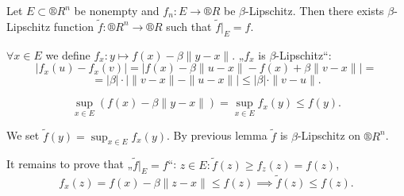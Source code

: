 \documentclass[12pt]{article}					%
\begin{document}
\begin{lemma}
	Let $E \subset ®R^n$ be nonempty and $f_n: E \rightarrow ®R$ be $\beta$-Lipschitz. Then there exists $\beta$-Lipschitz function $\tilde f: ®R^n \rightarrow ®R$ such that $\tilde f|_E = f$.

	\begin{dukazin}
		$\forall x \in E$ we define $f_x: y \mapsto f(x) - \beta \|y - x\|$. „$f_x$ is $\beta$-Lipschitz“:
		$$ |f_x(u) - f_x(v)| = \left|f(x) - \beta\|u - x\| - f(x) + \beta\|v - x\|\right| = $$
		$$ = |\beta|·\left| \|v - x\| - \|u - x\| \right| ≤ |\beta|·\|v - u\|. $$

		$$ \sup_{x \in E}(f(x) - \beta \|y - x\|) = \sup_{x \in E} f_x(y) ≤ f(y). $$

		We set $\tilde f(y) = \sup_{x \in E} f_x(y)$. By previous lemma $\tilde f$ is $\beta$-Lipschitz on $®R^n$.

		It remains to prove that „$\tilde f|_E = f$“: $z \in E: \tilde f(z) ≥ f_z(z) = f(z)$,
		$$ f_x(z) = f(x) - \beta\|z - x\| ≤ f(z) \implies \tilde f(z) ≤ f(z). $$
	\end{dukazin}
\end{lemma}
\end{document}
